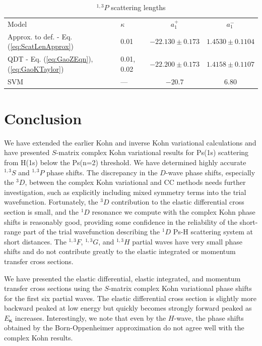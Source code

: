 \documentclass[preprint,showpacs,showkeys,preprintnumbers,amsmath,amssymb,longbibliography,pra,aps]{revtex4-1}
\begin{document}
{\begin{table}[H]
\begin{center}
\begin{ruledtabular}
\begin{tabular}{l l c c}
Model & $\kappa$ & $a_1^+$ & $a_1^-$ \\
\colrule
Approx. to def. - Eq. (\ref{eq:ScatLenApprox}) & 0.01 & $-22.130 \pm 0.173$ & $1.4530 \pm 0.1104$ \\
QDT - Eq. (\ref{eq:GaoZEqn}), (\ref{eq:GaoKTaylor}) & 0.01, 0.02 & $-22.200 \pm 0.173$ & $1.4158 \pm 0.1107$ \\
\colrule
SVM \cite{Ivanov2002} & --- & $-20.7$ & $6.80$ 
\end{tabular}
\end{ruledtabular}
\caption{$^{1,3}P$ scattering lengths}
\label{tab:PWaveScatLen}
\end{center}
\end{table}


\section{Conclusion}
We have extended the earlier Kohn 
and inverse Kohn variational calculations \cite{VanReeth2003,VanReeth2004}
and have presented $S$-matrix complex Kohn variational results for Ps(1s)
scattering from H(1s) below the Ps(n=2) threshold.
We have determined highly accurate $^{1,3}S$ and $^{1,3}P$ phase shifts.
The discrepancy in the $D$-wave phase shifts, especially the $^3D$, between the 
complex Kohn variational and CC methods needs further investigation, such as 
explicitly including mixed symmetry terms into the trial wavefunction.
Fortunately, the $^3D$ contribution to the elastic differential 
cross section is small, and the $^1D$ resonance we compute with the complex Kohn 
phase shifts is reasonably good, providing some confidence in the reliability 
of the short-range part of the trial wavefunction describing the $^1D$ Ps-H 
scattering system at short distances. The $^{1,3}F$, $^{1,3}G$, and $^{1,3}H$ partial
waves have very small phase shifts and do not contribute greatly to the
elastic integrated or momentum transfer cross sections.

We have presented the elastic differential, elastic integrated, and momentum 
transfer cross sections using the $S$-matrix 
complex Kohn variational phase shifts for the first six partial waves.
The elastic differential cross section is slightly more backward peaked at
low energy but quickly becomes strongly forward peaked as $E_{\bm \kappa}$
increases.
Interestingly, we note that even by the $H$-wave, the phase shifts obtained 
by the Born-Oppenheimer approximation do not agree well with the 
complex Kohn results.

}
\end{document}
